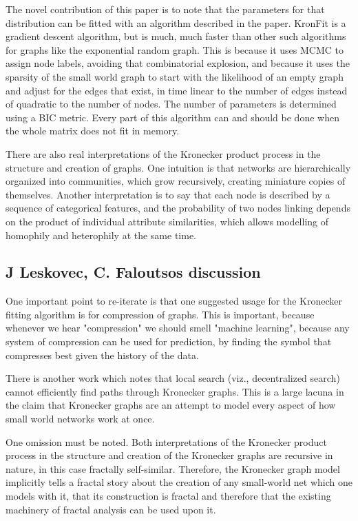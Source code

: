 \documentclass[12pt]{article}
\begin{document}
The novel contribution of this paper is to note that the parameters for that distribution can be fitted with an algorithm described in the paper. KronFit is a gradient descent algorithm, but is much, much faster than other such algorithms for graphs like the exponential random graph. This is because it uses MCMC to assign node labels, avoiding that combinatorial explosion, and because it uses the sparsity of the small world graph to start with the likelihood of an empty graph and adjust for the edges that exist, in time linear to the number of edges instead of quadratic to the number of nodes. The number of parameters is determined using a BIC metric. Every part of this algorithm can and should be done when the whole matrix does not fit in memory.

There are also real interpretations of the Kronecker product process in the structure and creation of graphs. One intuition is that networks are hierarchically organized into communities, which grow recursively, creating miniature copies of themselves. Another interpretation is to say that each node is described by a sequence of categorical features, and the probability of two nodes linking depends on the product of individual attribute similarities, which allows modelling of homophily and heterophily at the same time.

\subsection{J Leskovec, C. Faloutsos discussion}

One important point to re-iterate is that one suggested usage for the Kronecker fitting algorithm is for compression of graphs. This is important, because whenever we hear "compression" we should smell "machine learning", because any system of compression can be used for prediction, by finding the symbol that compresses best given the history of the data.

There is another work which notes that local search (viz., decentralized search) cannot efficiently find paths through Kronecker graphs. This is a large lacuna in the claim that Kronecker graphs are an attempt to model every aspect of how small world networks work at once. %

One omission must be noted. Both interpretations of the Kronecker product process in the structure and creation of the Kronecker graphs are recursive in nature, in this case fractally self-similar. Therefore, the Kronecker graph model implicitly tells a fractal story about the creation of any small-world net which one models with it, that its construction is fractal and therefore that the existing machinery of fractal analysis can be used upon it.
\end{document}
